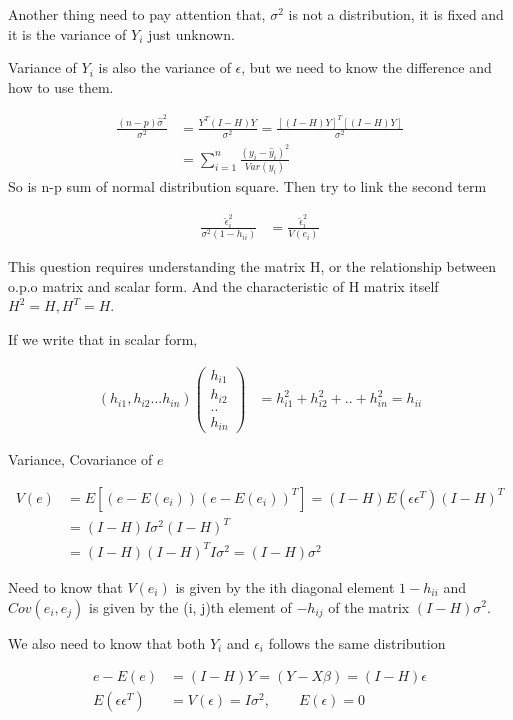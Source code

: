 Another thing need to pay attention that,  $\sigma^2$ is not a distribution, it is fixed and it is the variance of $Y_i$ just unknown. 

Variance of $Y_i$ is also the variance of $\epsilon$, but we need to know the difference and how to use them.

\begin{align*}
	\frac{(n-p)\hat{\sigma}^2 }{\sigma^2} &= \frac{Y^T (I-H) Y}{\sigma^2} = \frac{[(I-H)Y]^T [(I-H)Y]}{\sigma^2} \\
	&= \sum_{i=1}^n  \frac{(y_i-\hat{y}_i)^2}{Var(y_i)}
\end{align*}
So  is n-p sum of normal distribution square. Then try to link the second term

\begin{align*}
	\frac{\hat{\epsilon}_i^2}{\sigma^2(1-h_{ii})}&= \frac{\hat{\epsilon}_i^2}{V(e_i)} 
\end{align*}

This question requires understanding the matrix H, or the relationship between o.p.o matrix and scalar form. And the characteristic of H matrix itself $H^2 = H, H^T = H$. 

If we write that in scalar form, 

\begin{align*}
	(h_{i1} , h_{i2} ... h_{in}) \begin{pmatrix*} 
		h_{i1} \\
		h_{i2}\\
		..\\
		h_{in}
		\end{pmatrix*}
		  &= h_{i1}^2 + h_{i2}^2 + .. + h_{in}^2 = h_{ii}
\end{align*} 

Variance, Covariance of $e$

\begin{align*}
	V(e) &= E[(e - E(e_i)) (e - E(e_i))^T] = (I-H) E(\epsilon \epsilon^T) (I-H)^T \\
	&= (I-H) I \sigma^2 (I-H)^T \\
	&= (I-H)  (I-H)^T  I \sigma^2 = (I-H) \sigma^2
\end{align*} 

Need to know that $V(e_i)$ is given by the ith diagonal element $1 - h_{ii}$  and $Cov(e_i ,e_j )$ is given by the (i, j)th  element of $ -h_{ij}$ of the matrix $(I-H) \sigma^2$.

We also need to know that both $Y_i$ and $\epsilon_i$ follows the same distribution

\begin{align*}
	e - E(e) &= (I-H) Y = (Y- X\beta) = (I-H) \epsilon \\
	E(\epsilon \epsilon^T) &= V(\epsilon) = I\sigma^2 , \qquad E(\epsilon) = 0
\end{align*} 

